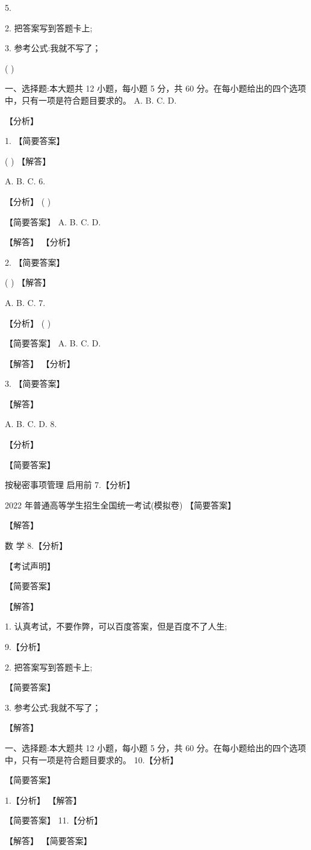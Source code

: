 \documentclass[10pt]{article}
\begin{document}
5.

2. 把答案写到答题卡上;

3. 参考公式:我就不写了；

( )

一、选择题:本大题共 12 小题，每小题 5 分，共 60 分。在每小题给出的四个选项中，只有一项是符合题目要求的。 A. B. C. D.

【分析】

1. 【简要答案】

( ) 【解答】

A. B. C. 6.

【分析】 ( )

【简要答案】 A. B. C. D.

【解答】 【分析】

2. 【简要答案】

( ) 【解答】

A. B. C. 7.

【分析】 ( )

【简要答案】 A. B. C. D.

【解答】 【分析】

3. 【简要答案】

【解答】

A. B. C. D. 8.

【分析】

【简要答案】

按秘密事项管理  启用前 7.【分析】

2022 年普通高等学生招生全国统一考试(模拟卷) 【简要答案】

【解答】

数 学 8.【分析】

【考试声明】

【简要答案】

【解答】

1. 认真考试，不要作弊，可以百度答案，但是百度不了人生;

9.【分析】

2. 把答案写到答题卡上;

【简要答案】

3. 参考公式:我就不写了；

【解答】

一、选择题:本大题共 12 小题，每小题 5 分，共 60 分。在每小题给出的四个选项中，只有一项是符合题目要求的。 10.【分析】

【简要答案】

1.【分析】 【解答】

【简要答案】 11.【分析】

【解答】 【简要答案】
\end{document}
